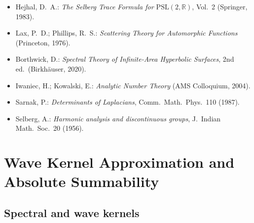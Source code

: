 \begin{itemize}
  \item Hejhal, D.~A.: \emph{The Selberg Trace Formula for $\mathrm{PSL}(2,\mathbb{R})$}, Vol.~2 (Springer, 1983). \cite{Hejhal1983vol2} %
  \item Lax, P.~D.; Phillips, R.~S.: \emph{Scattering Theory for Automorphic Functions} (Princeton, 1976). \cite{LaxPhillips1976} %
  \item Borthwick, D.: \emph{Spectral Theory of Infinite-Area Hyperbolic Surfaces}, 2nd ed.\ (Birkhäuser, 2020). \cite{Borthwick2020} %
  \item Iwaniec, H.; Kowalski, E.: \emph{Analytic Number Theory} (AMS Colloquium, 2004). \cite{IwaniecKowalski2004} %
  \item Sarnak, P.: \emph{Determinants of Laplacians}, Comm.\ Math.\ Phys.\ 110 (1987). \cite{Sarnak1987} %
  \item Selberg, A.: \emph{Harmonic analysis and discontinuous groups}, J.\ Indian Math.\ Soc.\ 20 (1956). \cite{Selberg1956} %
\end{itemize}


\section{Wave Kernel Approximation and Absolute Summability}
\label{sec:ch4-part2-wavekernel} \relax \hspace{0pt}

\subsection{Spectral and wave kernels}
\label{subsec:ch4-part2-spectral-wave} \relax

